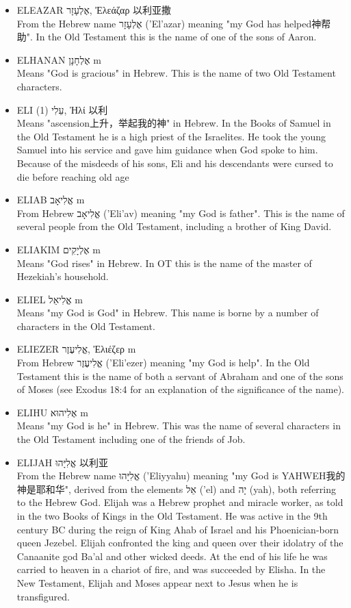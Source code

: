 \begin{itemize}
\item {ELEAZAR אֶלְעָזָר, Ἐλεάζαρ 以利亚撒}\\
From the Hebrew name אֶלְעָזָר ('El'azar) meaning "my God has helped神帮助". In the Old Testament this is the name of one of the sons of Aaron.

\item {ELHANAN אֶלְחָנָן m}\\
Means "God is gracious" in Hebrew. This is the name of two Old Testament characters.

\item {ELI (1) עֵלִי, Ἠλί 以利}\\
Means "ascension上升，举起我的神" in Hebrew. In the Books of Samuel in the Old Testament he is a high priest of the Israelites. He took the young Samuel into his service and gave him guidance when God spoke to him. Because of the misdeeds of his sons, Eli and his descendants were cursed to die before reaching old age

\item {ELIAB אֱלִיאָב m}\\
From Hebrew אֱלִיאָב ('Eli'av) meaning "my God is father". This is the name of several people from the Old Testament, including a brother of King David.

\item {ELIAKIM אֶלְיָקִים m}\\
Means "God rises" in Hebrew. In OT this is the name of the master of Hezekiah's household.

\item {ELIEL אֱלִיאֵל m}\\
Means "my God is God" in Hebrew. This name is borne by a number of characters in the Old Testament.

\item {ELIEZER אֱלִיעֶזֶר, Ἐλιέζερ m}\\
From Hebrew אֱלִיעֶזֶר ('Eli'ezer) meaning "my God is help". In the Old Testament this is the name of both a servant of Abraham and one of the sons of Moses (see Exodus 18:4 for an explanation of the significance of the name).

\item {ELIHU אֶלִיהוּא m}\\
Means "my God is he" in Hebrew. This was the name of several characters in the Old Testament including one of the friends of Job.

\item {ELIJAH אֱלִיָּהוּ 以利亚}\\
From the Hebrew name אֱלִיָּהוּ ('Eliyyahu) meaning "my God is YAHWEH我的神是耶和华", derived from the elements אֵל ('el) and יָה (yah), both referring to the Hebrew God. Elijah was a Hebrew prophet and miracle worker, as told in the two Books of Kings in the Old Testament. He was active in the 9th century BC during the reign of King Ahab of Israel and his Phoenician-born queen Jezebel. Elijah confronted the king and queen over their idolatry of the Canaanite god Ba'al and other wicked deeds. At the end of his life he was carried to heaven in a chariot of fire, and was succeeded by Elisha. In the New Testament, Elijah and Moses appear next to Jesus when he is transfigured.


\end{itemize}
